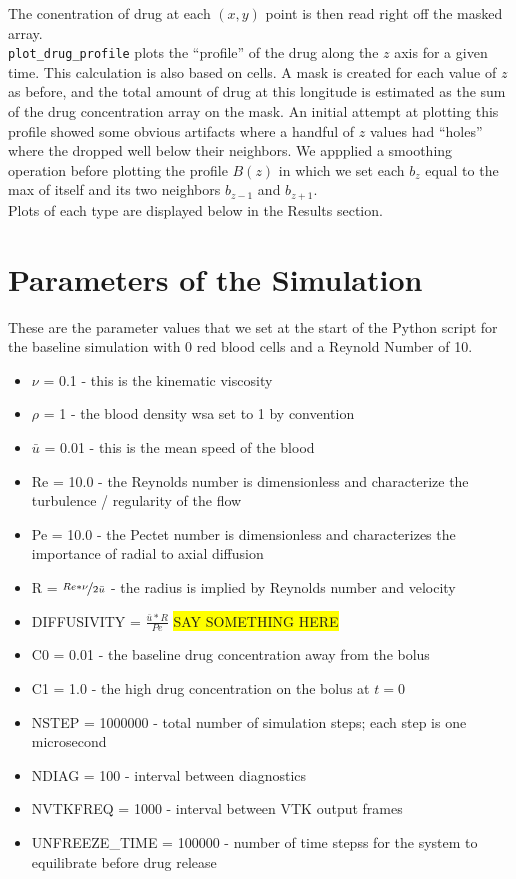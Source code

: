 \documentclass[11pt]{article} %
\newcommand{\tty}[1]{\texttt{#1}}
\begin{document}
The conentration of drug at each $(x, y)$ point is then read right off the masked array.\\
\tty{plot\_drug\_profile} plots the ``profile'' of the drug along the $z$ axis for a given time.
This calculation is also based on cells.  
A mask is created for each value of $z$ as before, and the total amount of drug 
at this longitude is estimated as the sum of the drug concentration array on the mask.
An initial attempt at plotting this profile showed some obvious artifacts where 
a handful of $z$ values had ``holes'' where the dropped well below their neighbors.
We appplied a smoothing operation before plotting the profile $B(z)$ in which 
we set each $b_z$ equal to the max of itself and its two neighbors $b_{z-1}$ and $b_{z+1}$.\\
Plots of each type are displayed below in the Results section.

\section{Parameters of the Simulation}
These are the parameter values that we set at the start of the Python script for the baseline simulation
with 0 red blood cells and a Reynold Number of 10.
\begin{itemize}
\item $\nu$ = 0.1 - this is the kinematic viscosity
\item $\rho$ = 1 - the blood density wsa set to 1 by convention
\item $\bar{u}$ = 0.01 - this is the mean speed of the blood
\item Re = 10.0 - the Reynolds number is dimensionless and characterize the turbulence / regularity of the flow
\item Pe = 10.0 - the Pectet number is dimensionless and characterizes the importance of radial to axial diffusion
\item R = $\nicefrac{Re * \nu}{2  \bar{u}}$ - the radius is implied by Reynolds number and velocity
\item DIFFUSIVITY = $\frac{\bar{u} * R}{Pe}$ \colorbox{yellow}{SAY SOMETHING HERE}
\item C0 = 0.01 - the baseline drug concentration away from the bolus
\item C1 = 1.0 - the high drug concentration on the bolus at $t=0$
\item NSTEP = 1000000 - total number of simulation steps; each step is one microsecond
\item NDIAG = 100 - interval between diagnostics
\item NVTKFREQ = 1000 - interval between VTK output frames
\item UNFREEZE\_TIME = 100000 - number of time stepss for the system to equilibrate before drug release
\end{itemize}
\end{document}
